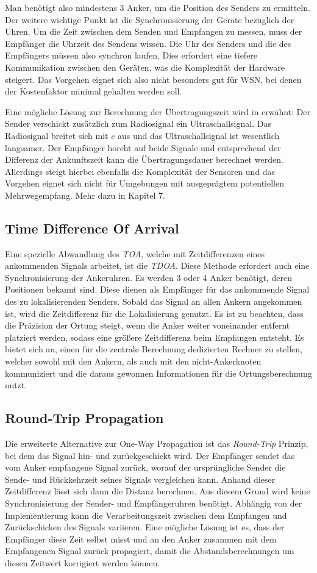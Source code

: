 \documentclass[12pt, a4wide]{scrreprt}
\begin{document}
Man benötigt also mindestens 3 Anker, um die Position des Senders zu ermitteln. Der weitere wichtige Punkt ist die Synchronisierung der Geräte bezüglich der Uhren.
Um die Zeit zwischen dem Senden und Empfangen zu messen, muss der Empfänger die Uhrzeit des Sendens wissen. Die Uhr des Senders und die des Empfängers müssen also synchron laufen. Dies erfordert eine tiefere Kommunikation zwischen den Geräten, was die Komplexität der Hardware steigert. Das Vorgehen eignet sich also nicht besonders gut für \ac{WSN}, bei denen der Kostenfaktor minimal gehalten werden soll.

Eine mögliche Lösung zur Berechnung der Übertragungszeit wird in \cite{q1} erwähnt: Der Sender verschickt zusätzlich zum Radiosignal ein Ultraschallsignal. Das Radiosignal breitet sich mit $c$ aus und das Ultraschallsignal ist wesentlich langsamer. Der Empfänger horcht auf beide Signale und entsprechend der Differenz der Ankunftszeit kann die Übertragungsdauer berechnet werden. Allerdings steigt hierbei ebenfalls die Komplexität der Sensoren und das Vorgehen eignet sich nicht für Umgebungen mit ausgeprägtem potentiellen Mehrwegempfang. Mehr dazu in Kapitel 7. 

    \subsection{Time Difference Of Arrival}
Eine spezielle Abwandlung des \textit{\ac{TOA}}, welche mit Zeitdifferenzen eines ankommenden Signals arbeitet, ist die \textit{\ac{TDOA}}. Diese Methode erfordert auch eine Synchronisierung der Ankeruhren. Es werden 3 oder 4 Anker benötigt, deren Positionen bekannt sind. Diese dienen als Empfänger für das ankommende Signal des zu lokalisierenden Senders. Sobald das Signal an allen Ankern angekommen ist, wird die Zeitdifferenz für die Lokalisierung genutzt. Es ist zu beachten, dass die Präzision der Ortung steigt, wenn die Anker weiter voneinander entfernt platziert werden, sodass eine größere Zeitdifferenz beim Empfangen entsteht\cite{q1}. Es bietet sich an, einen für die zentrale Berechnung dedizierten Rechner zu stellen, welcher sowohl mit den Ankern, als auch mit den nicht-Ankerknoten kommuniziert und die daraus gewonnen Informationen für die Ortungsberechnung nutzt\cite{tdoa}.

    \subsection{Round-Trip Propagation}
Die erweiterte Alternative zur One-Way Propagation ist das \textit{Round-Trip} Prinzip, bei dem das Signal hin- und zurückgeschickt wird. Der Empfänger sendet das vom Anker empfangene Signal zurück, worauf der ursprüngliche Sender die Sende- und Rückkehrzeit seines Signals vergleichen kann. Anhand dieser Zeitdifferenz lässt sich dann die Distanz berechnen. Aus diesem Grund wird keine Synchronisierung der Sender- und Empfängeruhren benötigt. Abhängig von der Implementierung kann die Verarbeitungszeit zwischen dem Empfangen und Zurückschicken des Signals variieren. Eine mögliche Lösung ist es, dass der Empfänger diese Zeit selbst misst und an den Anker zusammen mit dem Empfangenen Signal zurück propagiert, damit die Abstandsberechnungen um diesen Zeitwert korrigiert werden können\cite{q1}.
\end{document}
